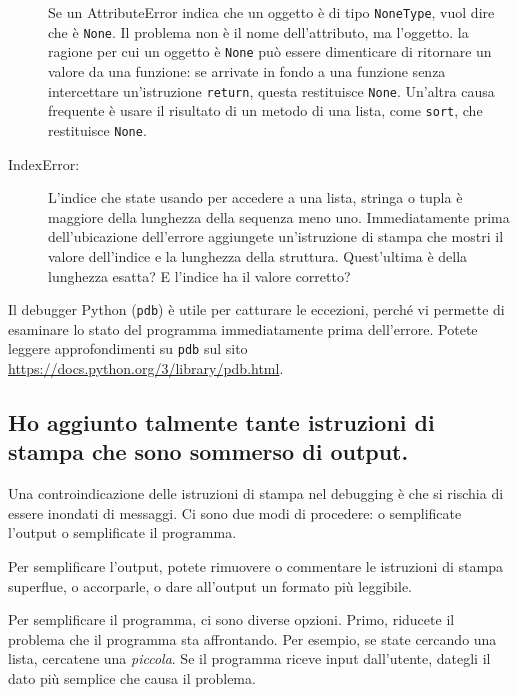 \documentclass[10pt]{book}
\begin{document}
\begin{description}
Se un AttributeError indica che un oggetto è di tipo {\tt NoneType},
vuol dire che è {\tt None}.  Il problema non è il nome dell'attributo, ma l'oggetto. la ragione per cui un oggetto è {\tt None} può essere dimenticare di ritornare un valore da una funzione: se arrivate in fondo a una funzione senza intercettare un'istruzione {\tt return}, questa restituisce {\tt None}.  Un'altra causa frequente è usare il risultato di un metodo di una lista, come {\tt sort}, che restituisce {\tt None}.

\item[IndexError:] L'indice che state usando per accedere a una lista, stringa o tupla è maggiore della lunghezza della sequenza meno uno. Immediatamente prima dell'ubicazione dell'errore aggiungete un'istruzione di stampa che mostri il valore dell'indice e la lunghezza della struttura. Quest'ultima è della lunghezza esatta? E l'indice ha il valore corretto?

\end{description}

Il debugger Python ({\tt pdb}) è utile per catturare le eccezioni, perché vi permette di esaminare lo stato del programma immediatamente prima dell'errore. Potete leggere approfondimenti su {\tt pdb} sul sito \url{https://docs.python.org/3/library/pdb.html}.

\subsection{Ho aggiunto talmente tante istruzioni di stampa che sono sommerso di output.}

Una controindicazione delle istruzioni di stampa nel debugging è che si rischia di essere inondati di messaggi. Ci sono due modi di procedere: o semplificate l'output o semplificate il programma.

Per semplificare l'output, potete rimuovere o commentare le istruzioni di stampa superflue, o accorparle, o dare all'output un formato più leggibile.

Per semplificare il programma, ci sono diverse opzioni. Primo, riducete il problema che il programma sta affrontando. Per esempio, se state cercando una lista, cercatene una {\em piccola}.  Se il programma riceve input dall'utente, dategli il dato più semplice che causa il problema.
\end{document}
